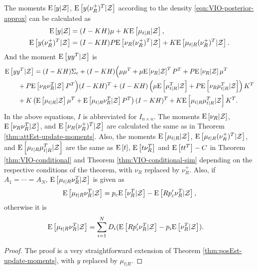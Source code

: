 \begin{theorem} \label{thm:VIO-posterior-conditional-moments}
	The moments $\mathrm{E}\left[ y|\mathcal{Z} \right]$, $\mathrm{E}\left[ y(\nu_R^+)^T|\mathcal{Z} \right]$ according to the density \eqref{eqn:VIO-posterior-approx} can be calculated as
	\begin{align}
		\mathrm{E}\left[ y|\mathcal{Z} \right] &= (I-KH)\mu + K\mathrm{E}\left[ \mu_{t|R}|\mathcal{Z} \right], \\
		\mathrm{E}\left[ y(\nu_R^+)^T|\mathcal{Z} \right] &= (I-KH)P\mathrm{E}\left[ \nu_R(\nu_R^+)^T|\mathcal{Z} \right] + K\mathrm{E}\left[ \mu_{t|R}(\nu_R^+)^T|\mathcal{Z} \right].
	\end{align}
	And the moment $\mathrm{E}\left[ yy^T|\mathcal{Z} \right]$ is
	\begin{align}
		&\mathrm{E}\left[ yy^T|\mathcal{Z} \right] = (I-KH)\Sigma_c + (I-KH) \Big( \mu\mu^T + \mu\mathrm{E}\left[ \nu_R|\mathcal{Z} \right]^TP^T + P\mathrm{E}\left[ \nu_R|\mathcal{Z} \right]\mu^T \nonumber \\
		&\qquad + P\mathrm{E}\left[ \nu_R\nu_R^T|\mathcal{Z} \right]P^T \Big) (I-KH)^T + (I-KH)\left( \mu\mathrm{E}\left[ \mu_{t|R}^T|\mathcal{Z} \right] + P\mathrm{E}\left[ \nu_R\mu_{t|R}^T|\mathcal{Z} \right] \right)K^T \nonumber \\
		&\qquad + K\left(\mathrm{E}\left[ \mu_{t|R}|\mathcal{Z} \right]\mu^T + \mathrm{E}\left[ \mu_{t|R}\nu_R^T|\mathcal{Z} \right]P^T\right)(I-KH)^T + K\mathrm{E}\left[ \mu_{t|R}\mu_{t|R}^T|\mathcal{Z} \right]K^T.
	\end{align}
	In the above equations, $I$ is abbreviated for $I_{n\times n}$.
	The moments $\mathrm{E}\left[ \nu_R|\mathcal{Z} \right]$, $\mathrm{E}\left[ \nu_R\nu_R^T|\mathcal{Z} \right]$, and $\mathrm{E}\left[ \nu_R(\nu_R^+)^T|\mathcal{Z} \right]$ are calculated the same as in Theorem \ref{thm:attEst-update-moments}.
	Also, the moments $\mathrm{E}\left[ \mu_{t|R}|\mathcal{Z} \right]$, $\mathrm{E}\left[ \mu_{t|R}(\nu_R^+)^T|\mathcal{Z} \right]$, and $\mathrm{E}\left[ \mu_{t|R}\mu_{t|R}^T|\mathcal{Z} \right]$ are the same as $\mathrm{E}\left[ t \right]$, $\mathrm{E}\left[ t\nu_R^T \right]$ and $\mathrm{E}\left[ tt^T \right]-C$ in Theorem \ref{thm:VIO-conditional} and Theorem \ref{thm:VIO-conditional-sim} depending on the respective conditions of the theorem, with $\nu_R$ replaced by $\nu_R^+$.
	Also, if $A_1 = \cdots = A_N$, $\mathrm{E}\left[ \mu_{t|R}\nu_R^T|\mathcal{Z} \right]$ is given as
	\begin{align}
		\mathrm{E}\left[ \mu_{t|R}\nu_R^T|\mathcal{Z} \right] = p_c\mathrm{E}\left[ \nu_R^T|\mathcal{Z} \right] - \mathrm{E}\left[ Rp'_c\nu_R^T|\mathcal{Z} \right],
	\end{align}
	otherwise it is
	\begin{align}
		\mathrm{E}\left[ \mu_{t|R}\nu_R^T|\mathcal{Z} \right] &= \sum_{i=1}^N D_i(\mathrm{E}\left[ Rp'_i\nu_R^T|\mathcal{Z} \right] - p_i\mathrm{E}\left[ \nu_R^T|\mathcal{Z} \right]).
	\end{align}
\end{theorem}
\begin{proof}
	The proof is a very straightforward extension of Theorem \ref{thm:posEst-update-moments}, with $y$ replaced by $\mu_{t|R}$.
\end{proof}

